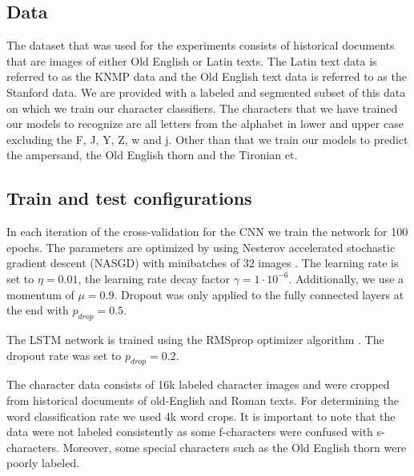 
\subsection{Data}
The dataset that was used for the experiments consists of historical documents that are images of either Old English or Latin texts. The Latin text data is referred to as the KNMP data and the Old English text data is referred to as the Stanford data. We are provided with a labeled and segmented subset of this data on which we train our character classifiers. The characters that we have trained our models to recognize are all letters from the alphabet in lower and upper case excluding the F, J, Y, Z, w and j. Other than that we train our models to predict the ampersand, the Old English thorn and the Tironian et.

\subsection{Train and test configurations}
In each iteration of the cross-validation for the CNN we train the network for 100 epochs. The parameters are optimized by using Nesterov accelerated stochastic gradient descent (NASGD) with minibatches of 32 images \cite{nesterov1983method}. The learning rate is set to $\eta=0.01$, the learning rate decay factor $\gamma=1\cdot10^{-6}$. Additionally, we use a momentum of $\mu=0.9$. Dropout was only applied to the fully connected layers at the end with $p_{drop}=0.5$.

The LSTM network is trained using the RMSprop optimizer algorithm \cite{tieleman2012lecture}. The dropout rate was set to $p_{drop}=0.2$. 

The character data consists of 16k labeled character images and were cropped from historical documents of old-English and Roman texts. For determining the word classification rate we used 4k word crops. It is important to note that the data were not labeled consistently as some f-characters were confused with s-characters. Moreover, some special characters such as the Old English thorn were poorly labeled.

